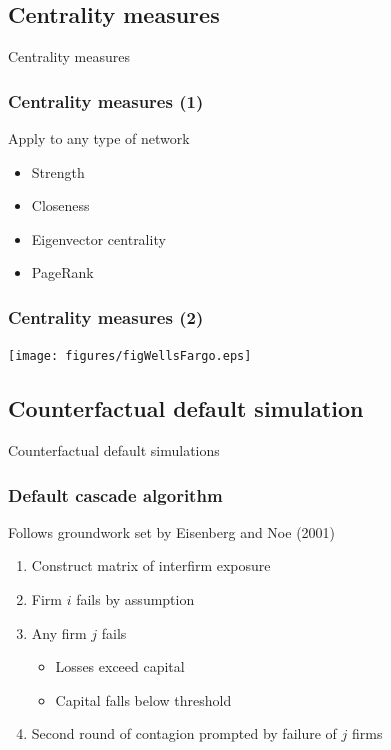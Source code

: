 \documentclass[aspectratio=43,dvipsnames,usenames, svgnames]{beamer}
\begin{document}
\subsection{Centrality measures}

\begin{frame} %
\begin{center}
	\Large{Centrality measures}
\end{center}
\end{frame}

\begin{frame} %
\frametitle{Centrality measures (1)}
Apply to any type of network
\vspace{1cm}
\begin{itemize}
	\item Strength
	\smallskip
	\item Closeness
	\smallskip
	\item Eigenvector centrality
	\smallskip
	\item PageRank
\end{itemize}
\end{frame}

\begin{frame} %
\frametitle{Centrality measures (2)}
\begin{center}
	\texttt{[image: figures/figWellsFargo.eps]}
\end{center}
\end{frame}

\subsection{Counterfactual default simulation}

\begin{frame} %
\begin{center}
	\Large{Counterfactual default simulations}
\end{center}
\end{frame}

\begin{frame} %
\frametitle{Default cascade algorithm}
Follows groundwork set by Eisenberg and Noe (2001)
\vspace{0.5mm}
\begin{enumerate}
[default]
	\item Construct matrix of interfirm exposure
	\smallskip
	\item Firm $i$ fails by assumption
	\smallskip
	\item Any firm $j$ fails
		\begin{itemize}
			\item Losses exceed capital
			\item Capital falls below threshold
		\end{itemize}
	\smallskip
	\item Second round of contagion prompted by failure of $j$ firms
\end{enumerate}
\vspace{1ex}
\color{red}{Don't forget: it is just a snapshot at time data was collected!}
\end{frame}
\end{document}
